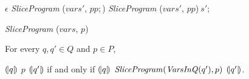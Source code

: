 \begin{algorithm}
  \begin{algorithmic}[1]
      \Case{$\epsilon$}
        \Return $\epsilon$
      \EndCase
            \Return \textit{SliceProgram} ($\mathit{vars}'$, $pp;$)
          \EndCase
            \Return \textit{SliceProgram} ($\mathit{vars}'$, $pp$)$\ s';$
          \EndCase
        \EndMatch
      \EndCase
    \EndMatch
  \end{algorithmic}
  \caption{\textit{SliceProgram} ($\mathit{vars}$, $p$)}
\end{algorithm}

\begin{theorem}
  For every $q, q' \in Q$ and $p \in P$,
  \begin{center}
  ${(\!|}{q}{|\!)}$ $p$ ${(\!|}{q'}{|\!)}$ if and only if
  ${(\!|}{q}{|\!)}$ 
  $\textmd{\textit{SliceProgram}}(\textmd{\textit{VarsInQ}}(q'), p)$
  ${(\!|}{q'}{|\!)}$.
  \end{center}

\end{theorem}